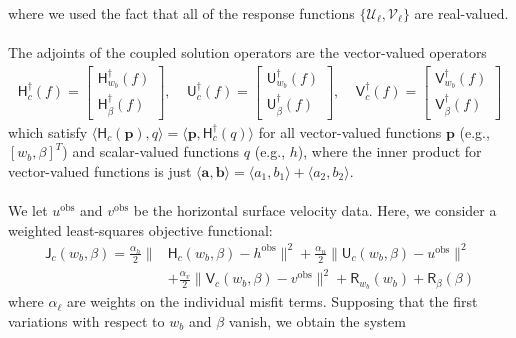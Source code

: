 \documentclass[paper=a4, fontsize=11pt]{article}
\begin{document}
where we used the fact that all of the response functions $\{\mathcal{U}_\ell,\mathcal{V}_\ell\}$
are real-valued.\\ \\
The adjoints of the coupled solution operators are the vector-valued operators
\begin{align}
\mathsf{H}_c^\dagger(f) = \begin{bmatrix}
 \mathsf{H}_{w_b}^\dagger(f) \\ \mathsf{H}_\beta^\dagger(f)
\end{bmatrix}, \;\;\;\;
\mathsf{U}_c^\dagger(f) = \begin{bmatrix}
 \mathsf{U}_{w_b}^\dagger(f) \\ \mathsf{U}_\beta^\dagger(f)
\end{bmatrix},\;\;\;\;
\mathsf{V}_c^\dagger(f) = \begin{bmatrix}
 \mathsf{V}_{w_b}^\dagger(f) \\ \mathsf{V}_\beta^\dagger(f)
\end{bmatrix}
\end{align}
which satisfy $\langle\mathsf{H}_c(\pmb{p}),q  \rangle = \langle\pmb{p},\mathsf{H}_c^\dagger(q) \rangle$ for all vector-valued functions $\pmb{p}$ (e.g., $[w_b,\beta]^T$) and scalar-valued functions $q$ (e.g., $h$),
where the inner product for vector-valued functions is just $\langle\pmb{a},\pmb{b} \rangle
= \langle a_1,b_1 \rangle + \langle a_2,b_2 \rangle $.
\\ \\
We let $u^\mathrm{obs}$ and $v^\mathrm{obs}$ be the horizontal surface velocity data.
Here, we consider a weighted least-squares objective functional:
\begin{align}
\mathsf{J}_c(w_b,\beta)  =  \frac{\alpha_h}{2}\|& \mathsf{H}_c(w_b,\beta) - h^{\mathrm{obs}} \|^2 +
 \frac{\alpha_u}{2}\| \mathsf{U}_c(w_b,\beta) - u^{\mathrm{obs}} \|^2 \\ & +
  \frac{\alpha_v}{2}\| \mathsf{V}_c(w_b,\beta) - v^{\mathrm{obs}} \|^2 +
\mathsf{R}_{w_b}(w_b) +\mathsf{R}_\beta(\beta) \label{lsq}
\end{align}
where $\alpha_\ell$ are weights on the individual misfit terms.
Supposing that the first variations with respect to $w_b$ and $\beta$ vanish,
we obtain the system
\end{document}
